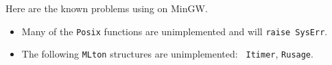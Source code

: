 
Here are the known problems using {\mlton} on MinGW.

\begin{itemize}

\item Many of the {\tt Posix} functions are unimplemented and will
{\tt raise SysErr}.

\item The following {\tt MLton} structures are unimplemented: {\tt
Itimer}, {\tt Rusage}.

\end{itemize}
